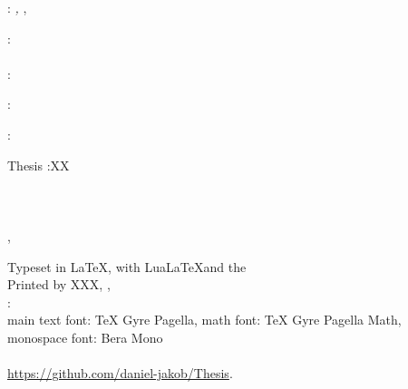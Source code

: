 \thispagestyle{empty}

\hfill

\vfill

\noindent\myName: \textit{\myTitle,} \mySubtitle, %
\textcopyright\ ~

\bigskip

\noindent{}: \\
\myProf \\

\noindent{}: \\
\myCollaborator


\noindent{}:\\
\myExaminer

\noindent{}:\\
\HoS

\bigskip
\noindent\myDegree Thesis :XX\\
\noindent\myDepartment\\
\noindent\myFaculty\\
\noindent\myUni\\
\noindent\myLocation, \myCountry

\vfill


\medskip
\noindent Typeset in \LaTeX, with Lua\LaTeX{}and the \ctVersion\\
\noindent Printed by XXX, , \myPrintLocation\\
\noindent{}: \\
\noindent main text font: TeX Gyre Pagella, math font: TeX Gyre Pagella Math, monospace font: Bera Mono\\
\noindent{}\\
\url{https://github.com/daniel-jakob/Thesis}.
